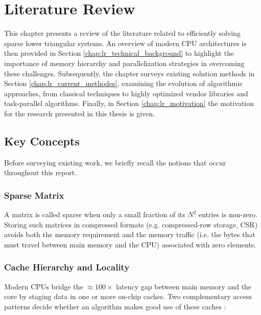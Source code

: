 \chapter{Literature Review}
\label{chapter:literature_review}

This chapter presents a review of the literature related to efficiently solving sparse lower triangular systems. An overview of modern CPU architectures is then provided in Section \ref{chap:lr_technical_background} to highlight the importance of memory hierarchy and parallelization strategies in overcoming these challenges. Subsequently, the chapter surveys existing solution methods in Section \ref{chap:lr_current_methodes}, examining the evolution of algorithmic approaches, from classical techniques to highly optimized vendor libraries and task-parallel algorithms. Finally, in Section \ref{chap:lr_motivation} the motivation for the research presented in this thesis is given.

\section{Key Concepts}

Before surveying existing work, we briefly recall the notions that occur
throughout this report.

\subsection{Sparse Matrix}
A matrix is called sparse when only a small fraction of its
$N^2$ entries is non-zero.  
Storing such matrices in compressed formats (e.g. compressed‐row
storage, CSR) avoids both
the memory requirement and the memory traffic (i.e. the bytes that must travel between main memory and the CPU) associated with zero elements.

\subsection{Cache Hierarchy and Locality}
Modern CPUs bridge the $\approx 100\times$ latency gap between main
memory and the core by staging data in one or more on-chip caches.
Two complementary access patterns decide whether an algorithm makes
good use of these caches \cite{rauber2023parallel}:

